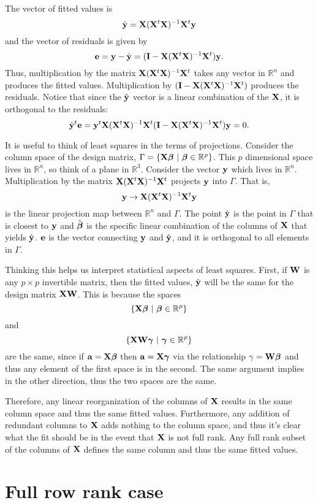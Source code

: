 The vector of fitted values is 
$$
\hat {\mathbf{y}} = \mathbf{X} (\mathbf{X}^t \mathbf{X})^{-1} \mathbf{X}^t\mathbf{y} 
$$
and the vector of residuals is given by
$$
\mathbf{e} = \mathbf{y} - \hat {\mathbf{y}} = (\mathbf{I} - \mathbf{X} (\mathbf{X}^t \mathbf{X})^{-1} \mathbf{X}^t) \mathbf{y}.
$$
Thus, multiplication by the matrix $\mathbf{X} (\mathbf{X}^t \mathbf{X})^{-1} \mathbf{X}^t$ takes any vector in
$\mathbb{R}^n$ and produces the fitted values. Multiplication
by $(\mathbf{I} - \mathbf{X} (\mathbf{X}^t \mathbf{X})^{-1} \mathbf{X}^t)$ produces the residuals. Notice that
since the $\hat {\mathbf{y}}$ vector is a linear combination of the $\mathbf{X}$,
it is orthogonal to the residuals:
$$
\hat {\mathbf{y}}^t \mathbf{e} = \mathbf{y} ^ t \mathbf{X} (\mathbf{X}^t \mathbf{X})^{-1} \mathbf{X}^t (\mathbf{I} - \mathbf{X} (\mathbf{X}^t \mathbf{X})^{-1} \mathbf{X}^t)\mathbf{y} = 0.
$$

It is useful to think of least squares in the terms of projections.
Consider the column space of the design matrix, 
$\Gamma = \{ \mathbf{X} \boldsymbol{\beta} ~|~ \boldsymbol{\beta} \in \mathbb{R}^p\}$. This $p$ 
dimensional space lives in $\mathbb{R}^n$, so think of a plane in 
$\mathbb{R}^3$. Consider the vector $\mathbf{y}$ which lives in $\mathbb{R}^n$. Multiplication by the matrix $\mathbf{X} (\mathbf{X}^t \mathbf{X})^{-1} \mathbf{X}^t$ projects $\mathbf{y}$ into $\Gamma$. That
is, 
$$
\mathbf{y} \rightarrow \mathbf{X} (\mathbf{X}^t \mathbf{X})^{-1} \mathbf{X}^t\mathbf{y}
$$
is the linear projection map between $\mathbb{R}^n$ and $\Gamma$.
The point $\hat {\mathbf{y}}$ is the point in $\Gamma$ that is closest to $\mathbf{y}$ and
$\hat {\boldsymbol{\beta}}$ is the specific linear combination of the columns
of $\mathbf{X}$ that yields $\hat {\mathbf{y}}$. 
$\mathbf{e}$ is the vector connecting $\mathbf{y}$ and $\hat {\mathbf{y}}$, and it is
orthogonal to all elements in $\Gamma$.  

Thinking this helps us interpret statistical aspects of least squares.
First, if $\mathbf{W}$ is any $p\times p $ invertible matrix, then the
fitted values, $\hat {\mathbf{y}}$ will be the same for the design matrix
$\mathbf{X} \mathbf{W}$. This is because the spaces
$$
\{\mathbf{X} \boldsymbol{\beta} ~|~ \boldsymbol{\beta} \in \mathbb{R}^p\}
$$
and
$$
\{\mathbf{X} \mathbf{W} \boldsymbol{\gamma} ~|~ \boldsymbol{\gamma} \in \mathbb{R}^p\}
$$
are the same, since if $\mathbf{a} = \mathbf{X} \boldsymbol{\beta}$ then $\mathbf{a} = \mathbf{X} \boldsymbol{\gamma}$ via the relationship $\gamma = \mathbf{W} \boldsymbol{\beta}$  and thus any element of the first
space is in the second. The same argument implies in the other direction,
thus the two spaces are the same.

Therefore, any linear reorganization of the columns of $\mathbf{X}$ results in the
same column space and thus the same fitted values. Furthermore, any
addition of redundant columns to $\mathbf{X}$ adds nothing to the column space,
and thus it's clear what the fit should be in the event that $\mathbf{X}$ is
not full rank. Any full rank subset of the columns of $\mathbf{X}$ defines
the same column and thus the same fitted values. 

\section{Full row rank case}

